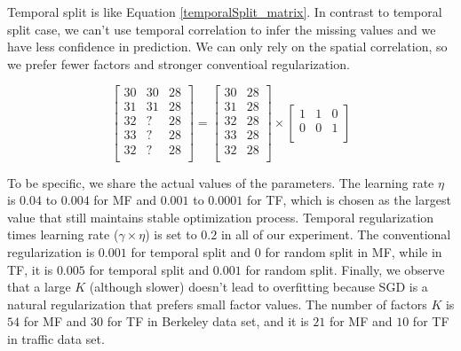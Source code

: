 Temporal split is like Equation \ref{temporalSplit_matrix}.
In contrast to temporal split case, we can't use temporal correlation to infer the missing values and we have less confidence in prediction.
We can only rely on the spatial correlation, so we prefer fewer factors and stronger conventioal regularization.

\begin{equation}
\label{temporalSplit_matrix}
\begin{bmatrix}
30 & 30 & 28\\
31 & 31 & 28\\
32 &  ? & 28\\
33 &  ? & 28\\
32 &  ? & 28\\
\end{bmatrix} 
= 
\begin{bmatrix}
30 & 28\\
31 & 28\\
32 & 28\\
33 & 28\\
32 & 28\\
\end{bmatrix} 
\times
\begin{bmatrix}
1 & 1 & 0\\
0 & 0 & 1\\
\end{bmatrix} 
\end{equation}

To be specific, we share the actual values of the parameters.
The learning rate $\eta$ is $0.04$ to $0.004$ for MF and $0.001$ to $0.0001$ for TF, which is chosen as the largest value that still maintains stable optimization process.
Temporal regularization times learning rate ($\gamma \times \eta$) is set to $0.2$ in all of our experiment.
The conventional regularization is $0.001$ for temporal split and $0$ for random split in MF, while in TF, it is $0.005$ for temporal split and $0.001$ for random split.
Finally, we observe that a large $K$ (although slower) doesn't lead to overfitting because SGD is a natural regularization that prefers small factor values. 
The number of factors $K$ is $54$ for MF and $30$ for TF in Berkeley data set, and it is $21$ for MF and $10$ for TF in traffic data set. 


